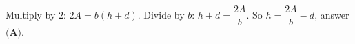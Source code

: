Multiply by $2$: $2A=b(h+d)$. Divide by $b$: $h+d=\dfrac{2A}{b}$. So $h=\dfrac{2A}{b}-d$, answer $\boxed{\textbf{(A)}}$.

